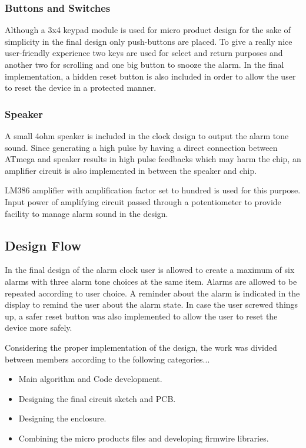 \documentclass[12pt,twocolumn]{article}
\begin{document}
        \subsubsection{Buttons and Switches}
Although a 3x4  keypad module is used for micro product design for the sake of simplicity in the 
final design only push-buttons are placed. To give a really nice user-friendly experience two 
keys are used for select and return purposes and another two for scrolling and one big button to 
snooze the alarm. In the final implementation, a hidden reset button is also included in order to 
allow the user to reset the device in a protected manner.


        \subsubsection{Speaker}
A small  4ohm speaker is included in the clock design to output the alarm tone sound. Since generating 
a high pulse by having a direct connection between ATmega and speaker results in high pulse feedbacks 
which may harm the chip, an amplifier circuit is also implemented in between the speaker and chip.

LM386 amplifier with amplification factor set to hundred is used for this purpose. Input power of 
amplifying circuit passed through a potentiometer to provide facility to manage alarm sound in the 
design.

    \subsection{Design Flow}
In the final design of the alarm clock user is allowed to create a maximum of six alarms with three 
alarm tone choices at the same item. Alarms are allowed to be repeated according to user choice. 
A reminder about the alarm is indicated in the display to remind the user about 
the alarm state. In case the user screwed things up, a safer reset button was also implemented to 
allow the user to reset the device more safely.

Considering the proper implementation of the design, the work was divided between members according 
to the following categories...
\begin{itemize}
 \item Main algorithm and Code development.
 \item Designing the final circuit sketch and PCB.
 \item Designing the enclosure.
 \item Combining the micro products files and developing firmwire libraries.
\end{itemize}
\end{document}
